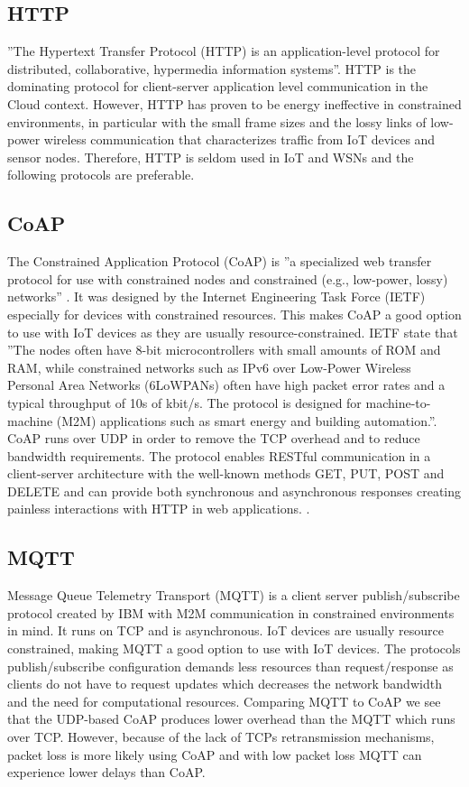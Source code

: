 \documentclass[]{uiophd}
\begin{document}
\subsection{HTTP}
 
''The Hypertext Transfer Protocol (HTTP) is an application-level protocol for distributed, collaborative, hypermedia information systems''\cite{HTTP1996}. HTTP is the dominating protocol for client-server application level communication in the Cloud context. However, HTTP has proven to be energy ineffective in constrained environments, in particular with the small frame sizes and the lossy links of low-power wireless communication that characterizes traffic from IoT devices and sensor nodes\cite{karagiannis2015survey}\cite{7030106}. Therefore, HTTP is seldom used in IoT and WSNs and the following protocols are preferable.

\subsection{CoAP}
The Constrained Application Protocol (CoAP) is ''a specialized web transfer protocol for use with constrained nodes and constrained (e.g., low-power, lossy) networks'' \cite{rfc7252}. It was designed by the Internet Engineering Task Force (IETF) especially for devices with constrained resources. This makes CoAP a good option to use with IoT devices as they are usually resource-constrained. IETF state that ''The nodes often have 8-bit microcontrollers with small amounts of ROM and RAM, while constrained networks such as IPv6 over Low-Power Wireless Personal Area Networks (6LoWPANs) often have high packet error rates and a typical throughput of 10s of kbit/s.  The protocol is designed for machine-to-machine (M2M) applications such as smart energy and building automation.''\cite{rfc7252}. CoAP runs over UDP in order to remove the TCP overhead and to reduce bandwidth requirements. The protocol enables RESTful communication in a client-server architecture with the well-known methods GET, PUT, POST and DELETE and can provide both synchronous and asynchronous responses creating painless interactions with HTTP in web applications.
\cite{rfc7252}
\cite{karagiannis2015survey}
\cite{7030106}.

\subsection{MQTT}
Message Queue Telemetry Transport (MQTT) is a client server publish/subscribe protocol created by IBM with M2M communication in constrained environments in mind. It runs on TCP and is asynchronous. IoT devices are usually resource constrained, making MQTT a good option to use with IoT devices. The protocols publish/subscribe configuration demands less resources than request/response as clients do not have to request updates which decreases the network bandwidth and the need for computational resources. Comparing MQTT to CoAP we see that the UDP-based CoAP produces lower overhead than the MQTT which runs over TCP. However, because of the lack of TCPs retransmission mechanisms, packet loss is more likely using CoAP and with low packet loss MQTT can experience lower delays than CoAP\cite{karagiannis2015survey}.
\end{document}
